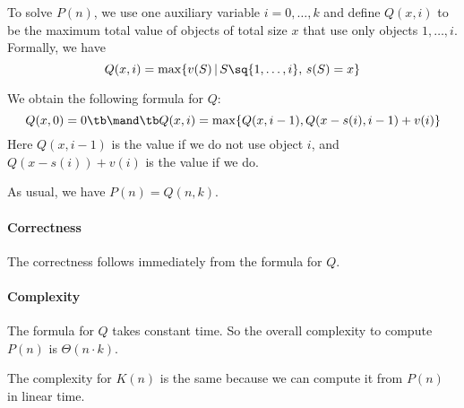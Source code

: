 To solve $P(n)$, we use one auxiliary variable $i=0,\ldots,k$ and define $Q(x,i)$ to be the maximum total value of objects of total size $x$ that use only objects $1,\ldots, i$.
Formally, we have
\[Q(x,i)=\max \{v(S) \,|\, S\sq \{1,\ldots,i\},\,s(S) = x\}\]

We obtain the following formula for $Q$:
\[Q(x,0)=0 \tb\mand\tb Q(x,i)=\max \{Q(x, i-1), Q(x-s(i), i-1)+v(i)\}\]
Here $Q(x,i-1)$ is the value if we do not use object $i$, and $Q(x-s(i))+v(i)$ is the value if we do.

As usual, we have $P(n)=Q(n,k)$.

\paragraph{Correctness}
The correctness follows immediately from the formula for $Q$.

\paragraph{Complexity}
The formula for $Q$ takes constant time. So the overall complexity to compute $P(n)$ is $\Theta(n\cdot k)$.

The complexity for $K(n)$ is the same because we can compute it from $P(n)$ in linear time.

%

